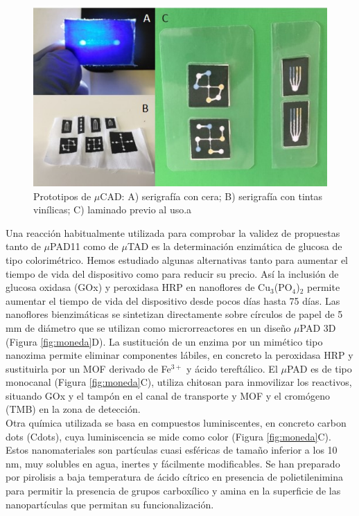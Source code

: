 \documentclass{article}
\begin{document}
\begin{figure}[h]
	\includegraphics[width=\textwidth]{tela}
	\caption{ Prototipos de $\mu$CAD: A) serigrafía con cera; B) serigrafía con tintas vinílicas; C) laminado previo al uso.a}
	\label{fig:tela}
\end{figure}
Una reacción habitualmente utilizada para comprobar la validez de propuestas tanto de $\mu$PAD11 como de $\mu$TAD es la determinación enzimática de glucosa de tipo colorimétrico. Hemos estudiado algunas alternativas tanto para aumentar el tiempo de vida del dispositivo como para reducir su precio. Así la inclusión de glucosa oxidasa (GOx) y peroxidasa HRP en nanoflores de Cu$_{3}$(PO$_{4}$)$_{2}$ permite aumentar el tiempo de vida del dispositivo desde pocos días hasta 75 días. Las nanoflores bienzimáticas se sintetizan directamente sobre círculos de papel de 5 mm de diámetro que se utilizan como microrreactores en un diseño $\mu$PAD 3D (Figura \ref{fig:moneda}D)\cite{Ariza-Avidad2016}. La sustitución de un enzima por un mimético tipo nanozima permite eliminar componentes lábiles, en concreto la peroxidasa HRP y sustituirla por un MOF derivado de Fe$^{3+}$ y ácido tereftálico. El $\mu$PAD es de tipo monocanal (Figura \ref{fig:moneda}C), utiliza chitosan para inmovilizar los reactivos, situando GOx y el tampón en el canal de transporte y MOF y el cromógeno (TMB) en la zona de detección\cite{Ortiz-Gomez2018}.\\

Otra química utilizada se basa en compuestos luminiscentes, en concreto carbon dots (Cdots), cuya luminiscencia se mide como color (Figura \ref{fig:moneda}C). Estos nanomateriales son partículas cuasi esféricas de tamaño inferior a los 10 nm, muy solubles en agua, inertes y fácilmente modificables. Se han preparado por pirolisis a baja temperatura de ácido cítrico en presencia de polietilenimina para permitir la presencia de grupos carboxílico y amina en la superficie de las nanopartículas que permitan su funcionalización\cite{Pedro2014}.\\
 
\end{document}
